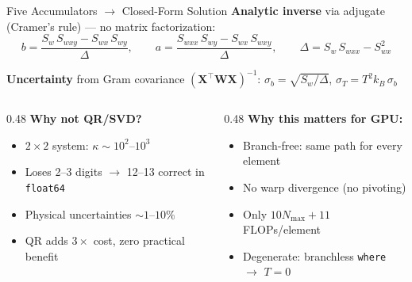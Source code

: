 \documentclass[aspectratio=169,10pt]{beamer}
\begin{document}
\begin{frame}{Five Accumulators $\to$ Closed-Form Solution}
	\textbf{Analytic inverse} via adjugate (Cramer's rule) --- \alert{no matrix factorization}:
	\begin{equation*}
		b = \frac{S_w\, S_{wxy} - S_{wx}\, S_{wy}}{\Delta}, \qquad
		a = \frac{S_{wxx}\, S_{wy} - S_{wx}\, S_{wxy}}{\Delta}, \qquad
		\Delta = S_w\, S_{wxx} - S_{wx}^2
	\end{equation*}

	\vspace{-0.3em}
	{\small\textbf{Uncertainty} from Gram covariance $(\bm{X}^\top\bm{W}\bm{X})^{-1}$:\quad
		$\sigma_b = \sqrt{S_w / \Delta}$,\quad
		$\sigma_T = T^2 k_B\, \sigma_b$}

	\vspace{0.2em}
	\begin{columns}[T]
		\begin{column}{0.48\textwidth}
			{\small\textbf{Why not QR/SVD?}}
			\begin{itemize}
				\item {\small $2{\times}2$ system: $\kappa \sim 10^2$--$10^3$}
				\item {\small Loses 2--3 digits $\to$ 12--13 correct in \texttt{float64}}
				\item {\small Physical uncertainties $\sim 1$--$10\%$}
				\item {\small QR adds $3\times$ cost, zero practical benefit}
			\end{itemize}
		\end{column}
		\begin{column}{0.48\textwidth}
			{\small\textbf{Why this matters for GPU:}}
			\begin{itemize}
				\item {\small \alert{Branch-free}: same path for every element}
				\item {\small No warp divergence (no pivoting)}
				\item {\small Only $10 N_\text{max} + 11$ FLOPs/element}
				\item {\small Degenerate: branchless \texttt{where} $\to$ $T\!=\!0$}
			\end{itemize}
		\end{column}
	\end{columns}
\end{frame}
\end{document}
